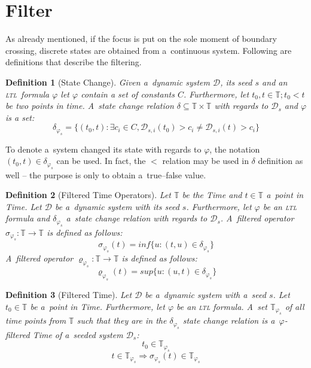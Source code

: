 \documentclass[12pt,oneside,draft]{fithesis}
\newcommand{\ltl}{\textsc{ltl}~}
\newcommand{\mD}{\mathcal{D}}
\newcommand{\mTime}{\mathbb{T}}
\newtheorem{mydef}{Definition}
\begin{document}
\section{Filter}
As already mentioned, if the focus is put on the sole moment of boundary
crossing, discrete states are obtained from a~continuous system.
Following are definitions that describe the filtering.
\begin{mydef}[State Change]
Given a~dynamic system $\mD$, its seed $s$ and an \ltl formula $\varphi$
let $\varphi$ contain a set of constants $C$.
Furthermore, let $t_0,t\in\mTime;t_0<t$ be two points in time.
A~state change relation
$\delta\subseteq\mTime\times\mTime$ with regards to $\mD_s$
and $\varphi$ is a set:
	\begin{equation}
\delta_{\varphi_s} = \{(t_0,t):\exists{}c_i\in{}C,\mD_{s,i}(t_0)>c_i\neq
\mD_{s,i}(t)>c_i\}
	\end{equation}
\end{mydef}
To denote a~system changed its state with regards to $\varphi$, the
notation $(t_0,t)\in\delta_{\varphi_s}$ can be used.
In fact, the $<$ relation may be used in $\delta$ definition as well --
the purpose is only to obtain a~true--false value.

\begin{mydef}[Filtered Time Operators]
Let $\mTime$ be the Time and $t\in\mTime$ a~point in Time.
Let $\mD$ be a~dynamic system with its seed $s$.
Furthermore, let $\varphi$ be an \textsc{ltl} formula and
$\delta_{\varphi_s}$ a~state change relation with regards to $\mD_s$.
A~filtered operator $\sigma_{\varphi_s}:\mTime\rightarrow\mTime$ is defined
as follows:
	\begin{equation}
		\sigma_{\varphi_s}(t) = inf\{u:(t,u)\in\delta_{\varphi_s}\}
	\end{equation}
A~filtered operator $\varrho_{\varphi_s}:\mTime\rightarrow\mTime$ is defined
as follows:
	\begin{equation}
		\varrho_{\varphi_s}(t) = sup\{u:(u,t)\in\delta_{\varphi_s}\}
	\end{equation}
\end{mydef}

\begin{mydef}[Filtered Time]
Let $\mD$ be a~dynamic system with a~seed $s$. Let $t_0\in\mTime$
be a~point in Time. Furthermore, let $\varphi$ be an \textsc{ltl}
formula. A~set $\mTime_{\varphi_s}$ of all time points from $\mTime$ such
that they are in the $\delta_{\varphi_s}$ state change relation is
a~$\varphi$-filtered Time of a~seeded system $\mD_s$:
$$t_0\in\mTime_{\varphi_s}$$
$$t\in\mTime_{\varphi_s}\Rightarrow\sigma_{\varphi_s}(t)\in\mTime_{\varphi_s}$$
\end{mydef}
\end{document}
